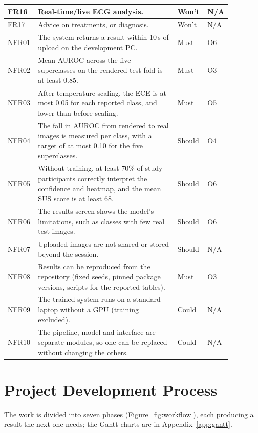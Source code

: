 \begin{table}[!htbp]
\begin{tabular}{|p{0.08\linewidth}|p{0.60\linewidth}|p{0.105\linewidth}|p{0.085\linewidth}|}
    \hline
    FR16 & Real-time/live ECG analysis. & Won't & N/A \\ %
    \hline
    FR17 & Advice on treatments, or diagnosis. & Won't & N/A \\
    \hline
    NFR01 & The system returns a result within 10\,s of upload on the development PC. & Must & O6 \\
    \hline
    NFR02 & Mean AUROC across the five superclasses on the rendered test fold is at least 0.85. & Must & O3 \\
    \hline
    NFR03 & After temperature scaling, the ECE is at most 0.05 for each reported class, and lower than before scaling. & Must & O5 \\
    \hline
    NFR04 & The fall in AUROC from rendered to real images is measured per class, with a target of at most 0.10 for the five superclasses. & Should & O4 \\
    \hline
    NFR05 & Without training, at least 70\% of study participants correctly interpret the confidence and heatmap, and the mean SUS score is at least 68. & Should & O6 \\
    \hline
    NFR06 & The results screen shows the model's limitations, such as classes with few real test images. & Should & O6 \\
    \hline
    NFR07 & Uploaded images are not shared or stored beyond the session. & Should & N/A \\
    \hline
    NFR08 & Results can be reproduced from the repository (fixed seeds, pinned package versions, scripts for the reported tables). & Must & O3 \\
    \hline
    NFR09 & The trained system runs on a standard laptop without a GPU (training excluded). & Could & N/A \\
    \hline
    NFR10 & The pipeline, model and interface are separate modules, so one can be replaced without changing the others. & Could & N/A \\
    \hline
  \end{tabular}
\end{table}

\section{Project Development Process}
\label{sec:dev-plan}

The work is divided into seven phases (Figure~\ref{fig:workflow}), each producing a result the next one needs; the Gantt charts are in Appendix~\ref{app:gantt}.

